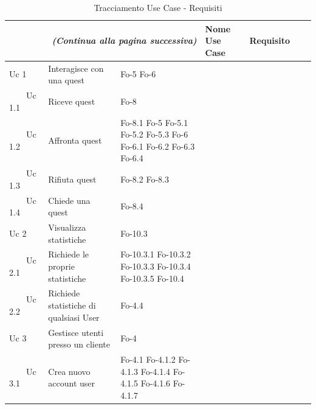 {{\begin{longtable}{|p{3.5cm}|p{6.5cm}|p{3cm}|}
\caption{Tracciamento Use Case - Requisiti}\\
\hline
\endfirsthead
\multicolumn{3}{r}{\textit{(Continua alla pagina successiva)}}
\endfoot
\multicolumn{3}{l}{\textit{(Continua dalla pagina precedente)}}
\endhead
\hline
\endlastfoot
\textbf{Codice Use Case}& \textbf{Nome Use Case}& \textbf{Requisito}\\
\hline
Uc 1 & Interagisce con una quest & Fo-5 \newline Fo-6\\
\hline
\ \ \ \ Uc 1.1 & Riceve quest & Fo-8 \newline\\
\hline
\ \ \ \ Uc 1.2 & Affronta quest & Fo-8.1 \newline Fo-5 \newline Fo-5.1 \newline Fo-5.2 \newline Fo-5.3 \newline Fo-6 \newline Fo-6.1 \newline Fo-6.2 \newline Fo-6.3 \newline Fo-6.4\\
\hline
\ \ \ \ Uc 1.3 & Rifiuta quest & Fo-8.2 \newline Fo-8.3 \\
\hline
\ \ \ \ Uc 1.4 & Chiede una quest & Fo-8.4\\
\hline
Uc 2 & Visualizza statistiche & Fo-10.3\\
\hline
\ \ \ \ Uc 2.1 & Richiede le proprie statistiche & Fo-10.3.1 \newline Fo-10.3.2 \newline Fo-10.3.3 \newline Fo-10.3.4 \newline Fo-10.3.5 \newline Fo-10.4\\
\hline
\ \ \ \ Uc 2.2 & Richiede statistiche di qualsiasi User & Fo-4.4\\
\hline
Uc 3 & Gestisce utenti presso un cliente & Fo-4\\
\hline
\ \ \ \ Uc 3.1 & Crea nuovo account user & Fo-4.1 \newline Fo-4.1.2 \newline Fo-4.1.3 \newline Fo-4.1.4 \newline Fo-4.1.5 \newline Fo-4.1.6 \newline Fo-4.1.7\\

\end{longtable}}}
